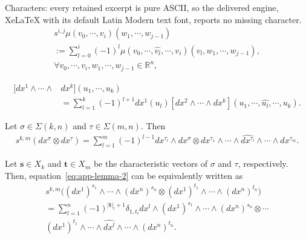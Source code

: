 \documentclass[10pt,a4paper]{amsart}
\newcommand{\charset}{X}
\begin{document}
Characters: every retained excerpt is pure ASCII, so the delivered engine, XeLaTeX with its default Latin Modern text font, reports no missing character.
\begin{multline}
\label{def:s}
s^{i, j}\mu (v_{0},\cdots,  v_{i})(w_{1}, \cdots, w_{j-1})
\\:=\sum_{l=0}^{i}(-1)^{l} \mu (v_{0},\cdots, \widehat{v_{l}}, \cdots,  v_{i})(v_{l}, w_{1}, \cdots, w_{j-1}), \\ \forall v_{0}, \cdots, v_{i}, w_{1}, \cdots, w_{j-1} \in \mathbb{R}^{n},
\end{multline}

\begin{align}\label{eqn:form}
[dx^{1}\wedge \cdots\wedge& dx^{k}](u_{1}, \cdots, u_{k})\\&\nonumber
=\sum_{l=1}^{k}(-1)^{l+1}dx^{1}(u_{l})[dx^{2}\wedge\cdots\wedge dx^{k}](u_{1}, \cdots, \widehat{u_{l}}, \cdots, u_{k}).
\end{align}

\begin{lemma}\label{lem:s}
Let $\sigma\in\Sigma(k,n)$ and $\tau\in\Sigma(m,n)$. Then
\begin{gather}
    \label{eq:app-lemma-2}
    s^{k,m} \left(dx^\sigma\otimes dx^\tau\right)
    = \sum_{l=1}^m (-1)^{l-1} dx^{\tau_l} \wedge dx^\sigma
    \otimes dx^{\tau_1}\wedge \cdots \wedge \widehat{dx^{\tau_l}}\wedge\cdots\wedge dx^{\tau_m}.
\end{gather}

Let $\bm s\in \charset_k$ and $\bm t\in\charset_m$ be the characteristic vectors of $\sigma$ and $\tau$, respectively. Then, equation~\eqref{eq:app-lemma-2} can be equivalently written as
\begin{multline}
    \label{eq:app-lemma-1}
    s^{k, m}\bigl((dx^{1})^{s_1}\wedge\cdots \wedge (dx^{n})^{s_n}\otimes (dx^{1})^{t_1}\wedge \cdots \wedge (dx^{n})^{t_n}\bigr)\\
    =
    \sum_{l=1}^{n}(-1)^{|\bm{t}|_{l}+1}\delta_{1,t_l}dx^{l}\wedge (dx^1)^{s_1}\wedge\cdots \wedge (dx^n)^{s_n}\otimes \cdots\\
    (dx^1)^{t_1}\wedge \cdots \wedge \widehat{dx^l}\wedge\cdots\wedge (dx^n)^{t_n}.
\end{multline}
\end{lemma}
\end{document}

